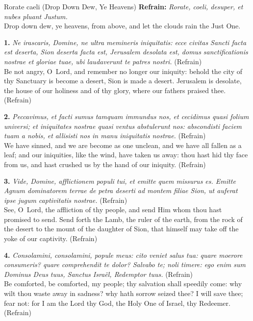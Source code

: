 \begin{massbox}{Rorate caeli (Drop Down Dew, Ye Heavens)}
\textbf{Refrain:} \textit{Rorate, coeli, desuper, et nubes pluant Justum.}\\
Drop down dew, ye heavens, from above, and let the clouds rain the Just One.

\smallskip
\textbf{1.} \textit{Ne irascaris, Domine, ne ultra memineris iniquitatis: ecce civitas Sancti facta est deserta, Sion deserta facta est, Jerusalem desolata est, domus sanctificationis nostrae et gloriae tuae, ubi laudaverunt te patres nostri.} (Refrain)\\
Be not angry, O~Lord, and remember no longer our iniquity: behold the city of thy Sanctuary is become a desert, Sion is made a desert. Jerusalem is desolate, the house of our holiness and of thy glory, where our fathers praised thee. (Refrain)

\smallskip
\textbf{2.} \textit{Peccavimus, et facti sumus tamquam immundus nos, et cecidimus quasi folium universi; et iniquitates nostrae quasi ventus abstulerunt nos: abscondisti faciem tuam a nobis, et allisisti nos in manu iniquitatis nostrae.} (Refrain)\\
We have sinned, and we are become as one unclean, and we have all fallen as a leaf; and our iniquities, like the wind, have taken us away: thou hast hid thy face from us, and hast crushed us by the hand of our iniquity. (Refrain)

\smallskip
\textbf{3.} \textit{Vide, Domine, afflictionem populi tui, et emitte quem missurus es. Emitte Agnum dominatorem terrae de petra deserti ad montem filiae Sion, ut auferat ipse jugum captivitatis nostrae.} (Refrain)\\
See, O~Lord, the affliction of thy people, and send Him whom thou hast promised to send. Send forth the Lamb, the ruler of the earth, from the rock of the desert to the mount of the daughter of Sion, that himself may take off the yoke of our captivity. (Refrain)

\smallskip
\textbf{4.} \textit{Consolamini, consolamini, popule meus: cito veniet salus tua: quare moerore consumeris? quare comprehendit te dolor? Salvabo te; noli timere: ego enim sum Dominus Deus tuus, Sanctus Isra\"el, Redemptor tuus.} (Refrain)\\
Be comforted, be comforted, my people; thy salvation shall speedily come: why wilt thou waste away in sadness? why hath sorrow seized thee? I will save thee; fear not: for I am the Lord thy God, the Holy One of Israel, thy Redeemer. (Refrain)
\end{massbox}

